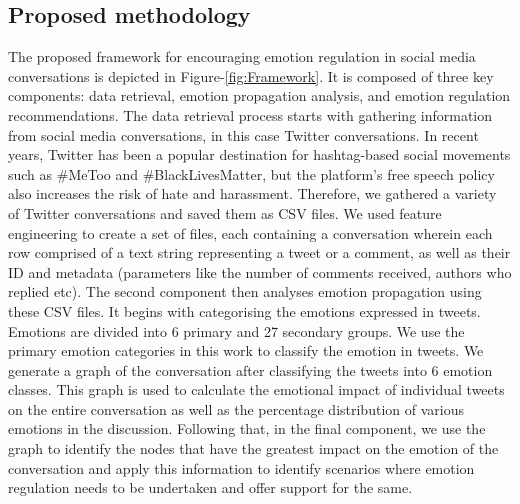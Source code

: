 \subsection{Proposed methodology}
The proposed framework for encouraging emotion regulation in social media conversations is depicted in Figure-\ref{fig:Framework}. It is composed of three key components: data retrieval, emotion propagation analysis, and emotion regulation recommendations. The data retrieval process starts with gathering information from social media conversations, in this case Twitter conversations. In recent years, Twitter has been a popular destination for hashtag-based social movements such as \#MeToo and \#BlackLivesMatter, but the platform's free speech policy also increases the risk of hate and harassment. Therefore, we gathered a variety of Twitter conversations and saved them as CSV files. We used feature engineering to create a set of files, each containing a conversation wherein each row comprised of a text string representing a tweet or a comment, as well as their ID and metadata (parameters like the number of comments received, authors who replied etc). The second component then analyses emotion propagation using these CSV files. It begins with categorising the emotions expressed in tweets. Emotions are divided into 6 primary and 27 secondary groups. We use the primary emotion categories in this work to classify the emotion in tweets. We generate a graph of the conversation after classifying the tweets into 6 emotion classes. This graph is used to calculate the emotional impact of individual tweets on the entire conversation as well as the percentage distribution of various emotions in the discussion. Following that, in the final component, we use the graph to identify the nodes that have the greatest impact on the emotion of the conversation and apply this information to identify scenarios where emotion regulation needs to be undertaken and offer support for the same.
